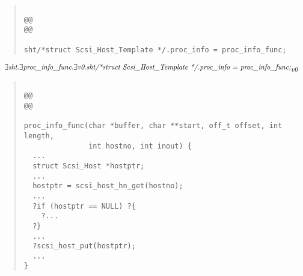 \documentclass{article}
\newcommand{\mita}[1]{\mbox{\it{{#1}}}}
\begin{document}
\begin{quote}\begin{verbatim}

@@
@@

sht/*struct Scsi_Host_Template */.proc_info = proc_info_func;
\end{verbatim}\end{quote}

\[\begin{array}{l}
\exists \mita{sht} . \exists \mita{proc\_info\_func} . \exists \mita{v0} . \mita{sht/*struct Scsi\_Host\_Template */.proc\_info = proc\_info\_func;}_{\mita{v0}}
\end{array}\]

\begin{quote}\begin{verbatim}

@@
@@

proc_info_func(char *buffer, char **start, off_t offset, int length,
               int hostno, int inout) {
  ...
  struct Scsi_Host *hostptr;
  ...
  hostptr = scsi_host_hn_get(hostno);
  ...
  ?if (hostptr == NULL) ?{
    ?...
  ?}
  ...
  ?scsi_host_put(hostptr);
  ...
}
\end{verbatim}\end{quote}
\end{document}
